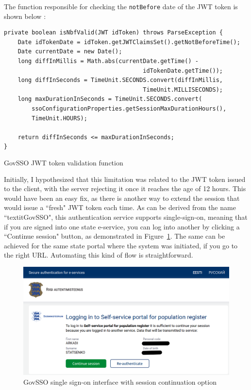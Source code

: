 The function responsible for checking the \texttt{notBefore} date of the JWT token is shown below \cite{govsso-session-hydra}:

\begin{listing}[H]
\begin{verbatim}
private boolean isNbfValid(JWT idToken) throws ParseException {
    Date idTokenDate = idToken.getJWTClaimsSet().getNotBeforeTime();
    Date currentDate = new Date();
    long diffInMillis = Math.abs(currentDate.getTime() -
                                        idTokenDate.getTime());
    long diffInSeconds = TimeUnit.SECONDS.convert(diffInMillis, 
                                        TimeUnit.MILLISECONDS);
    long maxDurationInSeconds = TimeUnit.SECONDS.convert(
        ssoConfigurationProperties.getSessionMaxDurationHours(), 
        TimeUnit.HOURS);

    return diffInSeconds <= maxDurationInSeconds;
}
\end{verbatim}
\caption{GovSSO JWT token validation function}
\label{lst:govsso-jwt-validation}
\end{listing}

Initially, I hypothesized that this limitation was related to the JWT token issued to the client, with the server rejecting it once it reaches the age of 12 hours. This would have been an easy fix, as there is another way to extend the session that would issue a ``fresh" JWT token each time. As can be derived from the name ``textit{GovSSO}", this authentication service supports single-sign-on, meaning that if you are signed into one state e-service, you can log into another by clicking a ``Continue session" button, as demonstrated in Figure~\ref{fig:eesti-ee-continue-session}. The same can be achieved for the same state portal where the system was initiated, if you go to the right URL. Automating this kind of flow is straightforward.

\begin{figure}[H]
\centering
\includegraphics[width=450px]{english/figures/Screenshot from 2025-08-08 20-37-42.png}
\caption{GovSSO single sign-on interface with session continuation option\cite{eesti-ee-screenshot}}
\label{fig:eesti-ee-continue-session}
\end{figure}

